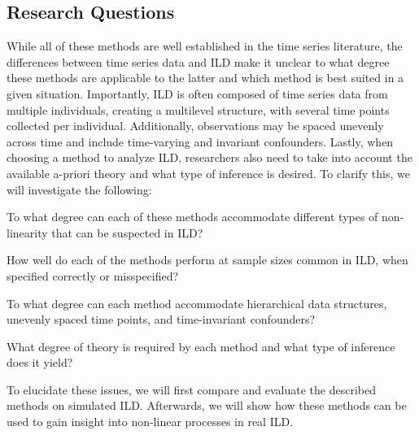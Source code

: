 \subsection{Research Questions}

While all of these methods are well established in the time series literature,
the differences between time series data and ILD make it unclear to what degree 
these methods are applicable to the latter and which method is best suited in a given 
situation. Importantly, ILD is often composed of time series data from multiple individuals, 
creating a multilevel structure, with several time points collected per individual.
Additionally, observations may be spaced unevenly across time and include time-varying 
and invariant confounders. Lastly, when choosing a method to analyze ILD, researchers 
also need to take into account the available a-priori theory and what type of inference 
is desired. To clarify this, we will investigate the following:

\begin{APAitemize}
    \item To what degree can each of these methods accommodate different types of non-linearity that can be suspected in ILD?
    \item How well do each of the methods perform at sample sizes common in ILD, when specified correctly or misspecified?
    \item To what degree can each method accommodate hierarchical data structures, unevenly spaced time points, and time-invariant confounders?
    \item What degree of theory is required by each method and what type of inference does it yield? 
\end{APAitemize}

To elucidate these issues, we will first compare and evaluate the described methods on
simulated ILD. Afterwards, we will show how these methods can be used to gain insight 
into non-linear processes in real ILD.
